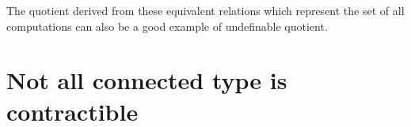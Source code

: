The quotient derived from these equivalent relations which represent
the set of all computations can also be a good
example of undefinable quotient.

\section{Not all connected type is contractible}


